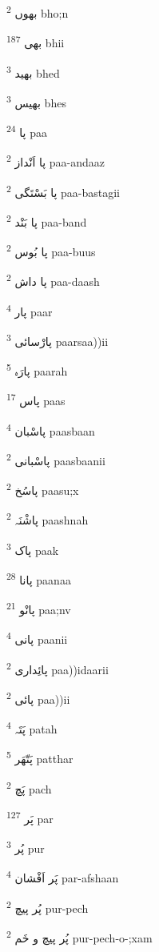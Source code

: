 \documentclass[12pt]{article}
\begin{document}
\begin{RTL}
\begin{multicols}{5}
{\ur بھوں}   \textsuperscript{2} bho;n

{\ur بھی}   \textsuperscript{187} bhii

{\ur بھید}   \textsuperscript{3} bhed

{\ur بھیس}   \textsuperscript{3} bhes

{\ur پا}   \textsuperscript{24} paa

{\ur پا اَنْداز}   \textsuperscript{2} paa-andaaz

{\ur پا بَسْتَگی}   \textsuperscript{2} paa-bastagii

{\ur پا بَنْد}   \textsuperscript{2} paa-band

{\ur پا بُوس}   \textsuperscript{2} paa-buus

{\ur پا داش}   \textsuperscript{2} paa-daash

{\ur پار}   \textsuperscript{4} paar

{\ur پارْسائی}   \textsuperscript{3} paarsaa))ii

{\ur پارَہ}   \textsuperscript{5} paarah

{\ur پاس}   \textsuperscript{17} paas

{\ur پاسْبان}   \textsuperscript{4} paasbaan

{\ur پاسْبانی}   \textsuperscript{2} paasbaanii

{\ur پاسُخ}   \textsuperscript{2} paasu;x

{\ur پاشْنَہ}   \textsuperscript{2} paashnah

{\ur پاک}   \textsuperscript{3} paak

{\ur پانا}   \textsuperscript{28} paanaa

{\ur پانْو}   \textsuperscript{21} paa;nv

{\ur پانی}   \textsuperscript{4} paanii

{\ur پائِداری}   \textsuperscript{2} paa))idaarii

{\ur پائی}   \textsuperscript{2} paa))ii

{\ur پَتَہ}   \textsuperscript{4} patah

{\ur پَتّھَر}   \textsuperscript{5} patthar

{\ur پَچ}   \textsuperscript{2} pach

{\ur پَر}   \textsuperscript{127} par

{\ur پُر}   \textsuperscript{3} pur

{\ur پَر اَفْشان}   \textsuperscript{4} par-afshaan

{\ur پُر پیچ}   \textsuperscript{2} pur-pech

{\ur پُر پیچ و خَم}   \textsuperscript{2} pur-pech-o-;xam


\end{multicols}
\end{RTL}
\end{document}
